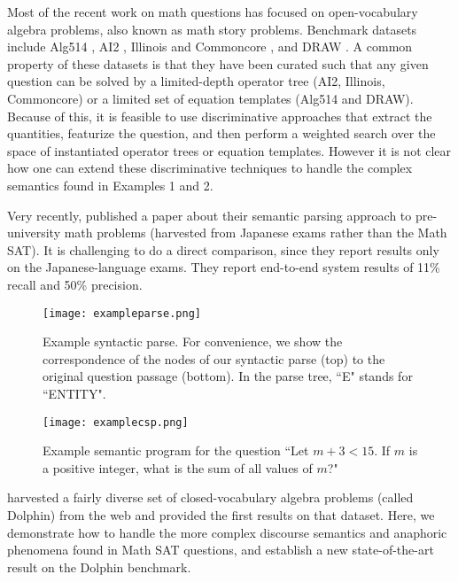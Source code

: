 \documentclass[11pt,letterpaper]{article}
\begin{document}
Most of the recent work on math questions has focused on open-vocabulary algebra problems, also known as math story problems. Benchmark datasets include Alg514 \cite{Kushman2014LearningTA}, AI2 \cite{Hosseini2014LearningTS}, Illinois and Commoncore \cite{Roy2015SolvingGA}, and DRAW \cite{Upadhyay2016AnnotatingDA}. A common property of these datasets is that they have been curated such that any given question can be solved by a limited-depth operator tree (AI2, Illinois, Commoncore) or a limited set of equation templates (Alg514 and DRAW). Because of this, it is feasible to use discriminative approaches \cite{Kushman2014LearningTA,Hosseini2014LearningTS,Roy2015SolvingGA,Zhou2015LearnTS,KoncelKedziorski2015ParsingAW,Mitra2016AddressingAQ} that extract the quantities, featurize the question, and then perform a weighted search over the space of instantiated operator trees or equation templates. However it is not clear how one can extend these discriminative techniques to handle the complex semantics found in Examples 1 and 2.



Very recently, \cite{Matsuzaki2017SemanticParsing} published a paper about their semantic parsing approach to pre-university math problems (harvested from Japanese exams rather than the Math SAT). It is challenging to do a direct comparison, since they report results only on the Japanese-language exams. They report end-to-end system results of 11\% recall and 50\% precision.

\begin{figure*}[tb]
\centering
\mbox{\texttt{[image: exampleparse.png]}}
\caption{\label{fig:exampleparse} Example syntactic parse. For convenience, we show the correspondence of the nodes of our syntactic parse (top) to the original question passage (bottom). In the parse tree, ``E" stands for ``ENTITY".}
\end{figure*}

\begin{figure*}[tb]
\centering
\mbox{\texttt{[image: examplecsp.png]}}
\caption{\label{fig:examplecsp} Example semantic program for the question ``Let $m+3<15$. If $m$ is a positive integer, what is the sum of all values of $m$?"}
\end{figure*}

\cite{Shi2015AutomaticallySN} harvested a fairly diverse set of closed-vocabulary algebra problems (called Dolphin) from the web and provided the first results on that dataset. Here, we demonstrate how to handle the more complex discourse semantics and anaphoric phenomena found in Math SAT questions, and establish a new state-of-the-art result on the Dolphin benchmark.  
\end{document}
